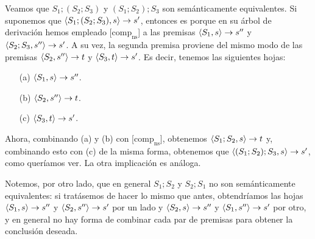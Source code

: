 \begin{example}
Veamos que $S_1; (S_2; S_3)$ y $(S_1; S_2); S_3$ son semánticamente equivalentes. Si suponemos que $\langle S_1; (S_2; S_3), s \rangle\rightarrow s'$, entonces es porque en su árbol de derivación hemos empleado [$\text{comp}_{\text{ns}}$] a las premisas $\langle S_1, s \rangle\rightarrow s''$ y $\langle S_2;S_3, s'' \rangle\rightarrow s'$. A su vez, la segunda premisa proviene del mismo modo de las premisas $\langle S_2, s'' \rangle\rightarrow t$ y $\langle S_3, t \rangle\rightarrow s'$. Es decir, tenemos las siguientes hojas:
\begin{itemize}
    \item[(a)] $\langle S_1, s \rangle\rightarrow s''$.
    \item[(b)] $\langle S_2, s'' \rangle\rightarrow t$.
    \item[(c)] $\langle S_3, t \rangle\rightarrow s'$.
\end{itemize}
Ahora, combinando (a) y (b) con [$\text{comp}_{\text{ns}}$], obtenemos $\langle S_1;S_2, s \rangle\rightarrow t$ y, combinando esto con (c) de la misma forma, obtenemos que $\langle (S_1; S_2);S_3, s \rangle\rightarrow s'$, como queríamos ver. La otra implicación es análoga.

Notemos, por otro lado, que en general $S_1;S_2$ y $S_2; S_1$ no son semánticamente equivalentes: si tratásemos de hacer lo mismo que antes, obtendríamos las hojas $\langle S_1, s \rangle\rightarrow s''$ y $\langle S_2, s'' \rangle\rightarrow s'$ por un lado y $\langle S_2, s \rangle\rightarrow s''$ y $\langle S_1, s'' \rangle\rightarrow s'$ por otro, y en general no hay forma de combinar cada par de premisas para obtener la conclusión deseada.
\end{example}
